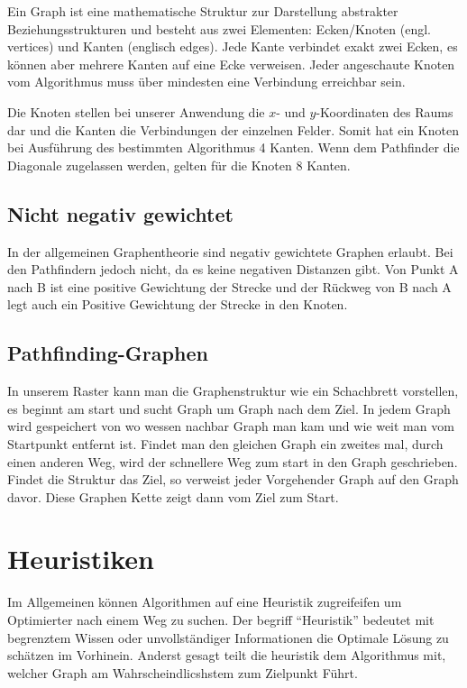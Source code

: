 Ein Graph ist eine mathematische Struktur zur Darstellung abstrakter
Beziehungsstrukturen und besteht aus zwei Elementen: Ecken/Knoten (engl.
vertices) und Kanten (englisch edges). Jede Kante verbindet exakt zwei
Ecken, es können aber mehrere Kanten auf eine Ecke verweisen. Jeder
angeschaute Knoten vom Algorithmus muss über mindesten eine Verbindung
erreichbar sein.

Die Knoten stellen bei unserer Anwendung die $x$- und $y$-Koordinaten des Raums
dar und die Kanten die Verbindungen der einzelnen Felder. Somit hat ein
Knoten bei Ausführung des bestimmten Algorithmus 4 Kanten. Wenn dem
Pathfinder die Diagonale zugelassen werden, gelten für die Knoten 8
Kanten.
\cite[Franz Embacher, 2003]{uniwiengraphen}

\subsection{Nicht negativ gewichtet}

In der allgemeinen Graphentheorie sind negativ gewichtete Graphen
erlaubt. Bei den Pathfindern jedoch nicht, da es keine negativen
Distanzen gibt. Von Punkt A nach B ist eine positive Gewichtung der
Strecke und der Rückweg von B nach A legt auch ein Positive Gewichtung
der Strecke in den Knoten.
\cite[Krumke; Noltemeier; Schwarz; Wirth, 2000, S. 76]{graphtheoryconcepts}

\subsection{Pathfinding-Graphen}

In unserem Raster kann man die Graphenstruktur wie ein Schachbrett
vorstellen, es beginnt am start und sucht Graph um Graph nach dem Ziel.
In jedem Graph wird gespeichert von wo wessen nachbar Graph man kam und
wie weit man vom Startpunkt entfernt ist. Findet man den gleichen Graph
ein zweites mal, durch einen anderen Weg, wird der schnellere Weg zum
start in den Graph geschrieben. Findet die Struktur das Ziel, so
verweist jeder Vorgehender Graph auf den Graph davor. Diese Graphen
Kette zeigt dann vom Ziel zum Start.
\cite[Vinther, Vinther, 2015, S. 22]{pftwodim}

%
\section{Heuristiken}

Im Allgemeinen können Algorithmen auf eine Heuristik zugreifeifen um
Optimierter nach einem Weg zu suchen. Der begriff ``Heuristik'' bedeutet
mit begrenztem Wissen oder unvollständiger Informationen die Optimale
Lösung zu schätzen im Vorhinein. Anderst gesagt teilt die heuristik dem
Algorithmus mit, welcher Graph am Wahrscheindlicshstem zum Zielpunkt
Führt.

